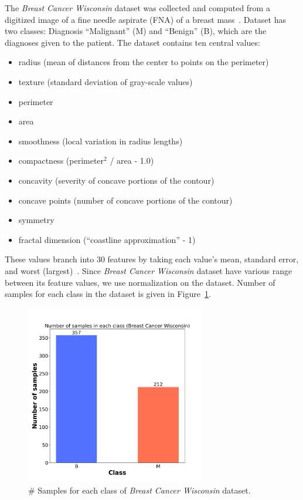 The \textit{Breast Cancer Wisconsin} dataset was collected and computed from a digitized image of a fine needle aspirate (FNA) of a breast mass~\cite{cancer}. Dataset has two classes: Diagnosis “Malignant” (M) and “Benign” (B), which are the diagnoses given to the patient. The dataset contains ten central values:

\begin{itemize}
\item radius (mean of distances from the center to points on the perimeter)
\item texture (standard deviation of gray-scale values)
\item perimeter
\item area
\item smoothness (local variation in radius lengths)
\item compactness (perimeter$^{2}$ / area - 1.0)
\item concavity (severity of concave portions of the contour)
\item concave points (number of concave portions of the contour)
\item symmetry
\item fractal dimension (“coastline approximation” - 1)
\end{itemize}

These values branch into 30 features by taking each value’s mean, standard error, and worst (largest)~\cite{cancer}. Since \textit{Breast Cancer Wisconsin} dataset have various range between its feature values, we use normalization on the dataset. Number of samples for each class in the dataset is given in Figure~\ref{sbreast}.

\begin{figure}[H]
    \centering
    \includegraphics[width=0.7\textwidth]{images/sample/breast_cancer.png}
    \caption{\# Samples for each class of \textit{Breast Cancer Wisconsin} dataset.}
    \label{sbreast}
\end{figure}

